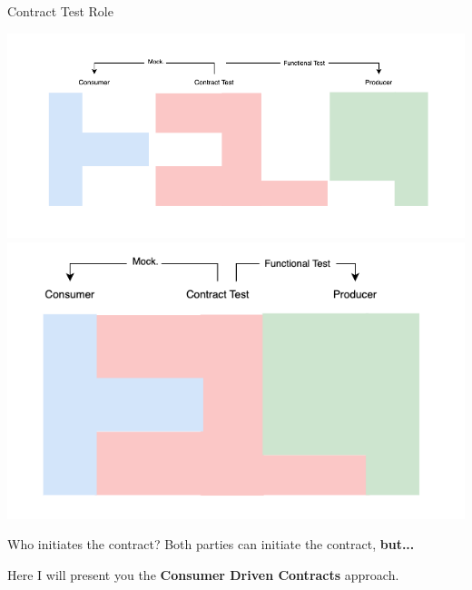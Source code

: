 \begin{frame}{Contract Test Role}
    \begin{center}
        \includegraphics[scale=.3]{./assets/contract_divided}
        \includegraphics[scale=.3]{./assets/contract_united}
    \end{center}
\end{frame}

\begin{frame}{Who initiates the contract?}
    Both parties can initiate the contract, \textbf{but...}

    Here I will present you the \textbf{Consumer Driven Contracts} approach.
\end{frame}

